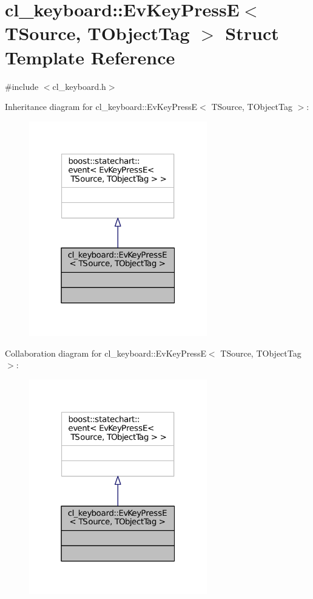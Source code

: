 \hypertarget{structcl__keyboard_1_1EvKeyPressE}{}\section{cl\+\_\+keyboard\+:\+:Ev\+Key\+PressE$<$ T\+Source, T\+Object\+Tag $>$ Struct Template Reference}
\label{structcl__keyboard_1_1EvKeyPressE}


{\ttfamily \#include $<$cl\+\_\+keyboard.\+h$>$}



Inheritance diagram for cl\+\_\+keyboard\+:\+:Ev\+Key\+PressE$<$ T\+Source, T\+Object\+Tag $>$\+:
\nopagebreak
\begin{figure}[H]
\begin{center}
\leavevmode
\includegraphics[width=220pt]{structcl__keyboard_1_1EvKeyPressE__inherit__graph}
\end{center}
\end{figure}


Collaboration diagram for cl\+\_\+keyboard\+:\+:Ev\+Key\+PressE$<$ T\+Source, T\+Object\+Tag $>$\+:
\nopagebreak
\begin{figure}[H]
\begin{center}
\leavevmode
\includegraphics[width=220pt]{structcl__keyboard_1_1EvKeyPressE__coll__graph}
\end{center}
\end{figure}


